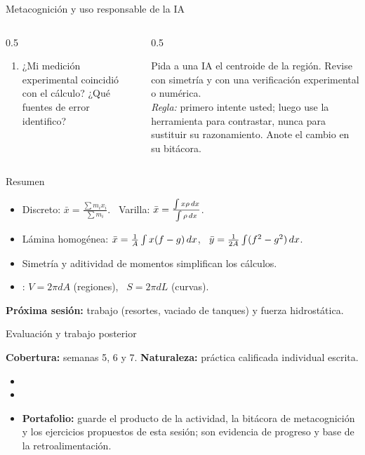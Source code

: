 \documentclass[10pt,aspectratio=169]{beamer}
\begin{document}
\begin{frame}{Metacognición y uso responsable de la IA}
  \small
  \begin{columns}[t]
    \begin{column}{0.5\textwidth}
      \begin{metacog}
        \begin{enumerate}
          \metacomun
          \item ¿Mi medición experimental coincidió con el cálculo? ¿Qué fuentes de error identifico?
        \end{enumerate}
      \end{metacog}
    \end{column}
    \begin{column}{0.5\textwidth}
      \begin{iabox}
        Pida a una IA el centroide de la región. Revise con simetría y con una verificación experimental o numérica.\\[2pt]
        \textit{Regla:} primero intente usted; luego use la herramienta para contrastar, nunca para sustituir su razonamiento. Anote el cambio en su bitácora.
      \end{iabox}
    \end{column}
  \end{columns}
\end{frame}

\begin{frame}{Resumen}
  \begin{itemize}
    \item Discreto: $\bar x=\frac{\sum m_ix_i}{\sum m_i}$. \ Varilla: $\bar x=\frac{\int x\rho\,dx}{\int\rho\,dx}$.
    \item Lámina homogénea: $\bar x=\frac1A\int x(f-g)\,dx$, \ $\bar y=\frac1{2A}\int(f^2-g^2)\,dx$.
    \item Simetría y aditividad de momentos simplifican los cálculos.
    \item {}: $V=2\pi dA$ (regiones), \ $S=2\pi dL$ (curvas).
  \end{itemize}
  \vspace{3mm}
  \textbf{Próxima sesión:} trabajo (resortes, vaciado de tanques) y fuerza hidrostática.
\end{frame}


\begin{frame}{Evaluación y trabajo posterior}
  \small
  \begin{evalbox}
    \textbf{Cobertura:} semanas 5, 6 y 7. \textbf{Naturaleza:} práctica calificada individual escrita.
  \end{evalbox}
  \begin{itemize}
    \item \criterios
    \item \declaracionia
    \item \textbf{Portafolio:} guarde el producto de la actividad, la bitácora de metacognición y los ejercicios propuestos de esta sesión; son evidencia de progreso y base de la retroalimentación.
  \end{itemize}
\end{frame}
\end{document}
